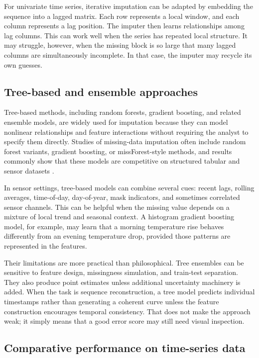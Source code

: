 For univariate time series, iterative imputation can be adapted by embedding the sequence into a lagged matrix. Each row represents a local window, and each column represents a lag position. The imputer then learns relationships among lag columns. This can work well when the series has repeated local structure. It may struggle, however, when the missing block is so large that many lagged columns are simultaneously incomplete. In that case, the imputer may recycle its own guesses.

\subsection{Tree-based and ensemble approaches}

Tree-based methods, including random forests, gradient boosting, and related ensemble models, are widely used for imputation because they can model nonlinear relationships and feature interactions without requiring the analyst to specify them directly. Studies of missing-data imputation often include random forest variants, gradient boosting, or missForest-style methods, and results commonly show that these models are competitive on structured tabular and sensor datasets \cite{Miao2023AnES,Lee2025ComparisonOM,Luo2022}.

In sensor settings, tree-based models can combine several cues: recent lags, rolling averages, time-of-day, day-of-year, mask indicators, and sometimes correlated sensor channels. This can be helpful when the missing value depends on a mixture of local trend and seasonal context. A histogram gradient boosting model, for example, may learn that a morning temperature rise behaves differently from an evening temperature drop, provided those patterns are represented in the features.

Their limitations are more practical than philosophical. Tree ensembles can be sensitive to feature design, missingness simulation, and train-test separation. They also produce point estimates unless additional uncertainty machinery is added. When the task is sequence reconstruction, a tree model predicts individual timestamps rather than generating a coherent curve unless the feature construction encourages temporal consistency. That does not make the approach weak; it simply means that a good error score may still need visual inspection.

\subsection{Comparative performance on time-series data}

